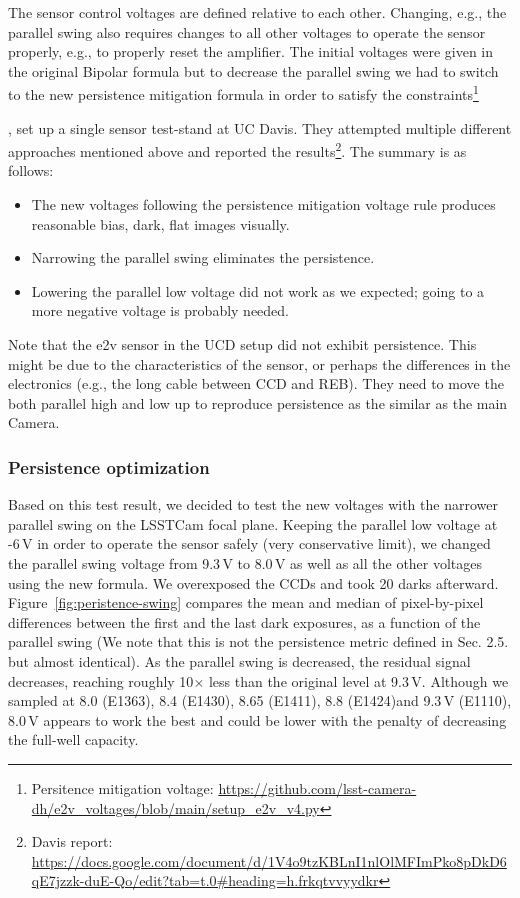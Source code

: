 The sensor control voltages are defined relative to each other. Changing, e.g., the parallel
swing also requires changes to all other voltages to
operate the sensor properly, e.g., to properly reset the amplifier.
The initial voltages were given in the original Bipolar formula
 but to decrease the parallel swing we had
to switch to the new persistence mitigation formula in order to satisfy the constraints\footnote{Persitence mitigation voltage: \url{https://github.com/lsst-camera-dh/e2v_voltages/blob/main/setup_e2v_v4.py}}

\citet{2024SPIE13103E..21S}, set up a single sensor test-stand at UC
Davis. They attempted multiple different approaches mentioned above and
reported the results\footnote{Davis report: \url{https://docs.google.com/document/d/1V4o9tzKBLnI1nlOlMFImPko8pDkD6qE7jzzk-duE-Qo/edit?tab=t.0\#heading=h.frkqtvvyydkr}}. The
summary is as follows:

\begin{itemize}
\tightlist
\item
  The new voltages following the persistence mitigation voltage rule produces reasonable bias, dark, flat images visually.
\item
  Narrowing the parallel swing eliminates the persistence.
\item
  Lowering the parallel low voltage did not work
  as we expected; going to a more negative voltage is probably needed.
\end{itemize}

Note that the e2v sensor in the UCD setup did not exhibit persistence.
This might be due to the characteristics of the sensor, or perhaps
the differences in the electronics (e.g., the long cable between CCD and REB). They need to move the both parallel high and low up to reproduce persistence as the similar as the main Camera.

\subsubsection{Persistence optimization}\label{persistence-optimization-1}
Based on this test result, we decided to test the new voltages with
the narrower parallel swing on the LSSTCam focal plane. Keeping the
parallel low voltage at -6\,V in order to operate the sensor safely (very
conservative limit), we changed the parallel swing voltage from 9.3\,V to
8.0\,V as well as all the other voltages using the new formula. We
overexposed the CCDs and took 20 darks afterward. Figure~\ref{fig:peristence-swing} compares the
mean and median of pixel-by-pixel differences between the first and the
last dark exposures, as a function of the parallel swing (We note that this is not the persistence metric defined in Sec. 2.5. but almost identical).
As the parallel swing is decreased, the residual signal decreases, reaching
roughly 10$\times$ less than the original level at 9.3\,V. Although we sampled
at 8.0 (E1363), 8.4 (E1430), 8.65 (E1411), 8.8 (E1424)and 9.3\,V (E1110), 8.0\,V appears to work the best and could
be lower with the penalty of decreasing the full-well capacity.

